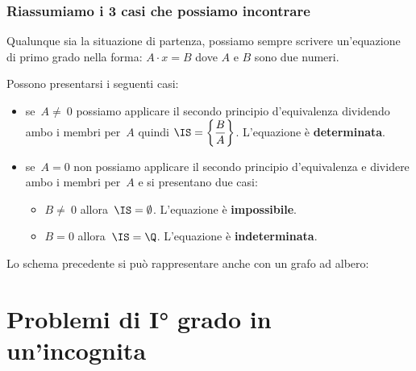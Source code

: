 \subsubsection{Riassumiamo i 3 casi che possiamo incontrare}
 

Qualunque sia la situazione di partenza, possiamo sempre scrivere un'equazione 
di primo grado nella forma: \quad 
\(A \cdot x = B\) \quad dove \(A\) e \(B\) sono due numeri.

Possono presentarsi i seguenti casi:
\begin{itemize} [nosep]
\item se~\(A\neq~0\) possiamo applicare il secondo principio
d'equivalenza dividendo ambo i membri per~\(A\) quindi
\(\IS =\left\{\dfrac{B}{A}\right\}\). L'equazione è \textbf{determinata}.
\item se~\(A=0\) non possiamo applicare il secondo principio
d'equivalenza e dividere ambo i membri per~\(A\) e si
presentano due casi:
\begin{itemize} [nosep]
\item \(B\neq~0\) allora~\(\IS =\emptyset \). 
L'equazione è \textbf{impossibile}.
\item \(B=0\) allora~\(\IS =\Q\). 
L'equazione è \textbf{indeterminata}.
\end{itemize}
\end{itemize}

Lo schema precedente si può rappresentare anche con un grafo ad albero:
{\alberoequazioni}





\section{Problemi di I° grado in un'incognita}
\label{sec:eq1_problemi}

